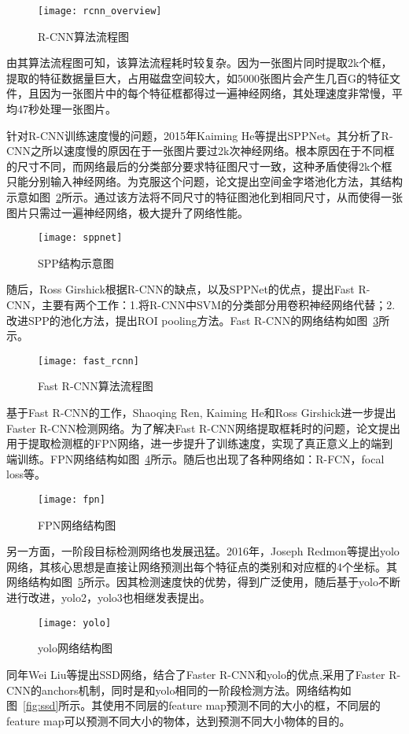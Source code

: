 \begin{figure}[htp]
\centering
\texttt{[image: rcnn\_overview]}
\caption{R-CNN算法流程图}
\label{fig:rcnn_overview}
\end{figure}
由其算法流程图可知，该算法流程耗时较复杂。因为一张图片同时提取2k个框，提取的特征数据量巨大，占用磁盘空间较大，如5000张图片会产生几百G的特征文件，且因为一张图片中的每个特征框都得过一遍神经网络，其处理速度非常慢，平均47秒处理一张图片。

针对R-CNN训练速度慢的问题，2015年Kaiming He等提出SPPNet。其分析了R-CNN之所以速度慢的原因在于一张图片要过2k次神经网络。根本原因在于不同框的尺寸不同，而网络最后的分类部分要求特征图尺寸一致，这种矛盾使得2k个框只能分别输入神经网络。为克服这个问题，论文提出空间金字塔池化方法，其结构示意如图~\ref{fig:sppnet}所示。通过该方法将不同尺寸的特征图池化到相同尺寸，从而使得一张图片只需过一遍神经网络，极大提升了网络性能。

\begin{figure}[htp]
\centering
\texttt{[image: sppnet]}
\caption{SPP结构示意图}
\label{fig:sppnet}
\end{figure}
随后，Ross Girshick根据R-CNN的缺点，以及SPPNet的优点，提出Fast R-CNN，主要有两个工作：1.将R-CNN中SVM的分类部分用卷积神经网络代替；2.改进SPP的池化方法，提出ROI pooling方法。Fast R-CNN的网络结构如图~\ref{fig:fast_rcnn}所示。

\begin{figure}[htp]
\centering
\texttt{[image: fast\_rcnn]}
\caption{Fast R-CNN算法流程图}
\label{fig:fast_rcnn}
\end{figure}
基于Fast R-CNN的工作，Shaoqing Ren, Kaiming He和Ross Girshick进一步提出Faster R-CNN检测网络。为了解决Fast R-CNN网络提取框耗时的问题，论文提出用于提取检测框的FPN网络，进一步提升了训练速度，实现了真正意义上的端到端训练。FPN网络结构如图~\ref{fig:fpn}所示。随后也出现了各种网络如：R-FCN，focal loss等。

\begin{figure}[htp]
\centering
\texttt{[image: fpn]}
\caption{FPN网络结构图}
\label{fig:fpn}
\end{figure}
另一方面，一阶段目标检测网络也发展迅猛。2016年，Joseph Redmon等提出yolo网络，其核心思想是直接让网络预测出每个特征点的类别和对应框的4个坐标。其网络结构如图~\ref{fig:yolo}所示。因其检测速度快的优势，得到广泛使用，随后基于yolo不断进行改进，yolo2，yolo3也相继发表提出。

\begin{figure}[htp]
\centering
\texttt{[image: yolo]}
\caption{yolo网络结构图}
\label{fig:yolo}
\end{figure}
同年Wei Liu等提出SSD网络，结合了Faster R-CNN和yolo的优点,采用了Faster R-CNN的anchors机制，同时是和yolo相同的一阶段检测方法。网络结构如图~\ref{fig:ssd}所示。其使用不同层的feature map预测不同的大小的框，不同层的feature map可以预测不同大小的物体，达到预测不同大小物体的目的。

